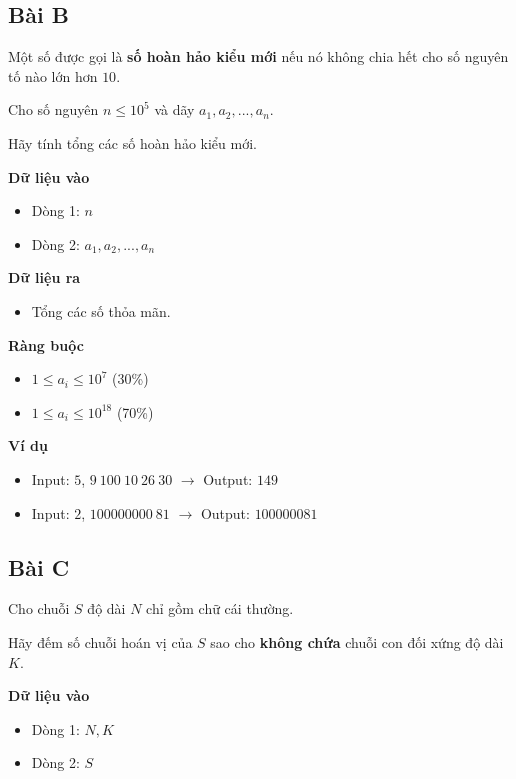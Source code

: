 \vspace{0.5cm}

\subsection*{Bài B}

Một số được gọi là \textbf{số hoàn hảo kiểu mới} nếu nó không chia hết cho số nguyên tố nào lớn hơn $10$.

Cho số nguyên $n \leq 10^5$ và dãy $a_1, a_2, ..., a_n$.

Hãy tính tổng các số hoàn hảo kiểu mới.

\textbf{Dữ liệu vào}
\begin{itemize}
    \item Dòng 1: $n$
    \item Dòng 2: $a_1, a_2, ..., a_n$
\end{itemize}

\textbf{Dữ liệu ra}
\begin{itemize}
    \item Tổng các số thỏa mãn.
\end{itemize}

\textbf{Ràng buộc}
\begin{itemize}
    \item $1 \le a_i \le 10^7$ (30\%)
    \item $1 \le a_i \le 10^{18}$ (70\%)
\end{itemize}

\textbf{Ví dụ}
\begin{itemize}
    \item Input: $5$, $9\ 100\ 10\ 26\ 30$ $\rightarrow$ Output: $149$
    \item Input: $2$, $100000000\ 81$ $\rightarrow$ Output: $100000081$
\end{itemize}

\vspace{0.5cm}

\subsection*{Bài C}

Cho chuỗi $S$ độ dài $N$ chỉ gồm chữ cái thường.

Hãy đếm số chuỗi hoán vị của $S$ sao cho \textbf{không chứa} chuỗi con đối xứng độ dài $K$.

\textbf{Dữ liệu vào}
\begin{itemize}
    \item Dòng 1: $N, K$
    \item Dòng 2: $S$
\end{itemize}

